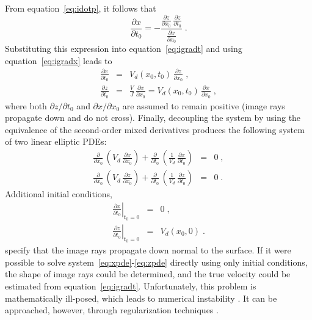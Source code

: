 From equation~\ref{eq:idotp}, it follows that
\begin{equation}
  \label{eq:xt}
  \frac{\partial x}{\partial t_0} = - 
  \frac
  {\displaystyle \frac{\partial z}{\partial x_0}\,\frac{\partial z}{\partial t_0}}
  {\displaystyle \frac{\partial x}{\partial x_0}}\;.
\end{equation}
Substituting this expression into equation~\ref{eq:igradt} and
using equation~\ref{eq:igradx} leads to
\begin{eqnarray}
\label{eq:xt2}
\frac{\partial x}{\partial t_0} & = &
V_d(x_0,t_0)\,\frac{\partial z}{\partial x_0}\;, \\
\label{eq:zt2}
\frac{\partial z}{\partial t_0} & = & 
\frac{V}{J}\,\frac{\partial x}{\partial x_0} =
V_d(x_0,t_0)\,\frac{\partial x}{\partial x_0}\;, 
\end{eqnarray}
where both $\partial z/\partial t_0$ and $\partial x/\partial x_0$ are
assumed to remain positive (image rays propagate down and do not
cross). Finally, decoupling the system by using the equivalence of the
second-order mixed derivatives produces the following system of two
linear elliptic PDEs:
\begin{eqnarray}
\label{eq:xpde}
\frac{\partial}{\partial x_0}\,
\left(V_d\,\frac{\partial x}{\partial x_0}\right)
+ \frac{\partial}{\partial t_0}\,
\left(\frac{1}{V_d}\,\frac{\partial x}{\partial t_0}\right) & = & 0\;, \\
\label{eq:zpde}
\frac{\partial}{\partial x_0}\,
\left(V_d\,\frac{\partial z}{\partial x_0}\right)
+ \frac{\partial}{\partial t_0}\,
\left(\frac{1}{V_d}\,\frac{\partial z}{\partial t_0}\right) & = & 0\;.
\end{eqnarray}
Additional initial conditions,
\begin{eqnarray}
\label{eq:xbound}
\left. \frac{\partial x}{\partial t_0}\right|_{t_0=0} & = & 0 \;, \\
\label{eq:zbound}
\left. \frac{\partial z}{\partial t_0}\right|_{t_0=0} & = & V_d(x_0,0)\;. 
\end{eqnarray}
specify that the image rays propagate down normal to the surface. If
it were possible to solve system~\ref{eq:xpde}-\ref{eq:zpde}
directly using only initial conditions, the shape of image rays could
be determined, and the true velocity could be estimated from
equation~\ref{eq:igradt}. Unfortunately, this problem is
mathematically ill-posed, which leads to numerical
instability \cite[]{tikh}. It can be approached, however, through
regularization techniques \cite[]{jcp}.

